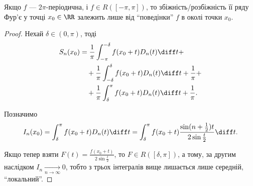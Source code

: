 \begin{theorem}
    Якщо $f$ --- $2\pi$-періодична, і $f \in R([-\pi,\pi])$, то збіжність/розбіжність її ряду Фур'є у точці $x_0 \in \RR$ залежить лише від ``поведінки'' $f$ в околі точки $x_0$.
\end{theorem}
\begin{proof}
    Нехай $\delta \in (0,\pi)$, тоді
    \begin{equation}
        \begin{aligned}
            S_n(x_0)
            &= \frac{1}{\pi} \int_{-\pi}^{-\delta} f(x_0 + t) D_n(t) \diff t + \\
            &\quad + \frac{1}{\pi} \int_{-\delta}^\delta f(x_0 + t) D_n(t) \diff t + \frac{1}{\pi} + \\
            &\quad + \frac{1}{\pi} \int_\delta^\pi f(x_0 + t) D_n(t) \diff t + \frac{1}{\pi}.
        \end{aligned}
    \end{equation}
    
    Позначимо
    \begin{equation}
        I_n(x_0) = \int_\delta^\pi f(x_0 + t) D_n(t) \diff t = \int_\delta^\pi f(x_0 + t) \frac{\sin(n+\frac{1}{2})t}{2\sin\frac{t}{2}} \diff t.
    \end{equation}
    
    Якщо тепер взяти $F(t) = \frac{f(x_0 + t)}{2 \sin \frac{t}{2}}$, то $F \in R([\delta,\pi])$, а тому, за другим наслідком $I_n \xrightarrow[n\to\infty]{} 0$, тобто з трьох інтегралів вище лишається лише середній, ``локальний''.
\end{proof}
